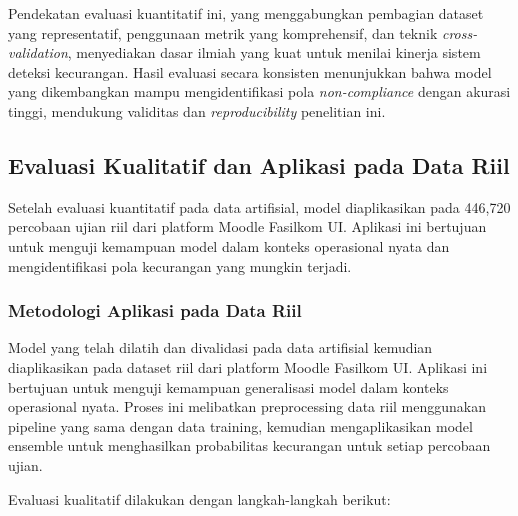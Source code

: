 Pendekatan evaluasi kuantitatif ini, yang menggabungkan pembagian dataset yang representatif, penggunaan metrik yang komprehensif, dan teknik \textit{cross-validation}, menyediakan dasar ilmiah yang kuat untuk menilai kinerja sistem deteksi kecurangan. Hasil evaluasi secara konsisten menunjukkan bahwa model yang dikembangkan mampu mengidentifikasi pola \textit{non-compliance} dengan akurasi tinggi, mendukung validitas dan \textit{reproducibility} penelitian ini.

\subsection{Evaluasi Kualitatif dan Aplikasi pada Data Riil}
\label{sec:evaluasiKualitatifStudiKasus}
Setelah evaluasi kuantitatif pada data artifisial, model diaplikasikan pada 446,720 percobaan ujian riil dari platform Moodle Fasilkom UI. Aplikasi ini bertujuan untuk menguji kemampuan model dalam konteks operasional nyata dan mengidentifikasi pola kecurangan yang mungkin terjadi.

\subsubsection{Metodologi Aplikasi pada Data Riil}
Model yang telah dilatih dan divalidasi pada data artifisial kemudian diaplikasikan pada dataset riil dari platform Moodle Fasilkom UI. Aplikasi ini bertujuan untuk menguji kemampuan generalisasi model dalam konteks operasional nyata. Proses ini melibatkan preprocessing data riil menggunakan pipeline yang sama dengan data training, kemudian mengaplikasikan model ensemble untuk menghasilkan probabilitas kecurangan untuk setiap percobaan ujian.

Evaluasi kualitatif dilakukan dengan langkah-langkah berikut:

